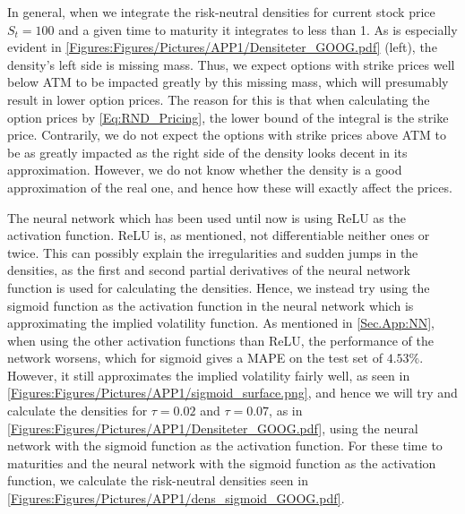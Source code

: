 In general, when we integrate the risk-neutral densities for current stock price $S_t=100$ and a given time to maturity it integrates to less than 1. As is especially evident in \autoref{Figures:Figures/Pictures/APP1/Densiteter_GOOG.pdf} (left), the density's left side is missing mass. Thus, we expect options with strike prices well below ATM to be impacted greatly by this missing mass, which will presumably result in lower option prices. The reason for this is that when calculating the option prices by \eqref{Eq:RND_Pricing}, the lower bound of the integral is the strike price. Contrarily, we do not expect the options with strike prices above ATM to be as greatly impacted as the right side of the density looks decent in its approximation. However, we do not know whether the density is a good approximation of the real one, and hence how these will exactly affect the prices. 

The neural network which has been used until now is using ReLU as the activation function. ReLU is, as mentioned, not differentiable neither ones or twice. This can possibly explain the irregularities and sudden jumps in the densities, as the first and second partial derivatives of the neural network function is used for calculating the densities. Hence, we instead try using the sigmoid function as the activation function in the neural network which is approximating the implied volatility function. As mentioned in \autoref{Sec.App:NN}, when using the other activation functions than ReLU, the performance of the network worsens, which for sigmoid gives a MAPE on the test set of $4.53\%$. However, it still approximates the implied volatility fairly well, as seen in \autoref{Figures:Figures/Pictures/APP1/sigmoid_surface.png}, and hence we will try and calculate the densities for $\tau=0.02$ and $\tau=0.07$, as in \autoref{Figures:Figures/Pictures/APP1/Densiteter_GOOG.pdf}, using the neural network with the sigmoid function as the activation function. For these time to maturities and the neural network with the sigmoid function as the activation function, we calculate the risk-neutral densities seen in \autoref{Figures:Figures/Pictures/APP1/dens_sigmoid_GOOG.pdf}.


